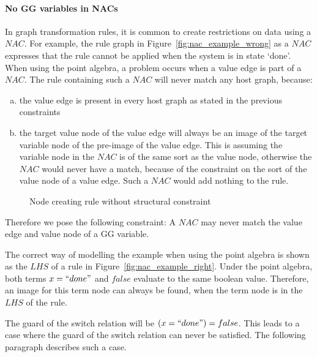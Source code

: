 \paragraph*{No GG variables in NACs}
In graph transformation rules, it is common to create restrictions on data using a $\mathit{NAC}$. For example, the rule graph in Figure~\ref{fig:nac_example_wrong} as a $\mathit{NAC}$ expresses that the rule cannot be applied when the system is in state `done'. When using the point algebra, a problem occurs when a value edge is part of a $\mathit{NAC}$. The rule containing such a $\mathit{NAC}$ will never match any host graph, because:
\begin{enumerate}[(a)]
\item the value edge is present in every host graph as stated in the previous constraints
\item the target value node of the value edge will always be an image of the target variable node of the pre-image of the value edge. This is assuming the variable node in the $\mathit{NAC}$ is of the same sort as the value node, otherwise the $\mathit{NAC}$ would never have a match, because of the constraint on the sort of the value node of a value edge. Such a $\mathit{NAC}$ would add nothing to the rule.
\end{enumerate}

\begin{figure}[ht]
  \begin{center}
  \end{center}
  \caption{Node creating rule without structural constraint}
  \label{fig:nac_example}
\end{figure}

Therefore we pose the following constraint: A $\mathit{NAC}$ may never match the value edge and value node of a GG variable. 

The correct way of modelling the example when using the point algebra is shown as the $\mathit{LHS}$ of a rule in Figure~\ref{fig:nac_example_right}. Under the point algebra, both terms $x=``done"$ and $false$ evaluate to the same boolean value. Therefore, an image for this term node can always be found, when the term node is in the $\mathit{LHS}$ of the rule. 

The guard of the switch relation will be $(x = ``done") = false$. This leads to a case where the guard of the switch relation can never be satisfied. The following paragraph describes such a case.

